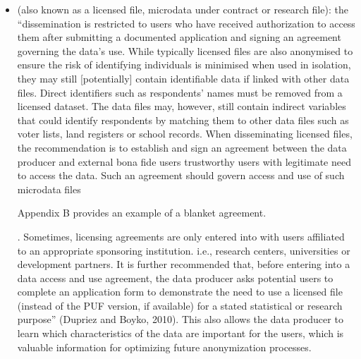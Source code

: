 \documentclass[letterpaper,10pt,english]{sphinxmanual}
\begin{document}
\begin{itemize}
\item {} 
 (also known as a licensed file,
microdata under contract or research file): the “dissemination is
restricted to users who have received authorization to access them
after submitting a documented application and signing an agreement
governing the data’s use. While typically licensed files are also
anonymised to ensure the risk of identifying individuals is minimised
when used in isolation, they may still {[}potentially{]} contain
identifiable data if linked with other data files. Direct identifiers
such as respondents’ names must be removed from a licensed dataset.
The data files may, however, still contain indirect variables that
could identify respondents by matching them to other data files such
as voter lists, land registers or school records. When disseminating
licensed files, the recommendation is to establish and sign an
agreement between the data producer and external bona fide users \textendash{}
trustworthy users with legitimate need to access the data. Such an
agreement should govern access and use of such microdata
files %
\begin{footnote}[2]\sphinxAtStartFootnote
Appendix B provides an example of a blanket agreement.
%
\end{footnote}. Sometimes, licensing agreements are only
entered into with users affiliated to an appropriate sponsoring
institution. i.e., research centers, universities or development
partners. It is further recommended that, before entering into a data
access and use agreement, the data producer asks potential users to
complete an application form to demonstrate the need to use a
licensed file (instead of the PUF version, if available) for a stated
statistical or research purpose” (Dupriez and Boyko, 2010). This also
allows the data producer to learn which characteristics of the data
are important for the users, which is valuable information for
optimizing future anonymization processes.


\end{itemize}
\end{document}
